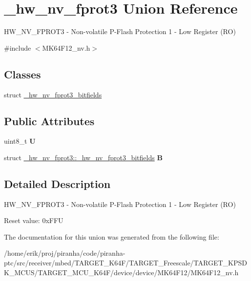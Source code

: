 \hypertarget{union__hw__nv__fprot3}{}\section{\+\_\+hw\+\_\+nv\+\_\+fprot3 Union Reference}
\label{union__hw__nv__fprot3}


H\+W\+\_\+\+N\+V\+\_\+\+F\+P\+R\+O\+T3 -\/ Non-\/volatile P-\/\+Flash Protection 1 -\/ Low Register (RO)  




{\ttfamily \#include $<$M\+K64\+F12\+\_\+nv.\+h$>$}

\subsection*{Classes}
\begin{DoxyCompactItemize}
\item 
struct \hyperlink{struct__hw__nv__fprot3_1_1__hw__nv__fprot3__bitfields}{\+\_\+hw\+\_\+nv\+\_\+fprot3\+\_\+bitfields}
\end{DoxyCompactItemize}
\subsection*{Public Attributes}
\begin{DoxyCompactItemize}
\item 
uint8\+\_\+t {\bfseries U}\hypertarget{union__hw__nv__fprot3_abf8e2ccc95a17a7e84459ca2d775defd}{}\label{union__hw__nv__fprot3_abf8e2ccc95a17a7e84459ca2d775defd}

\item 
struct \hyperlink{struct__hw__nv__fprot3_1_1__hw__nv__fprot3__bitfields}{\+\_\+hw\+\_\+nv\+\_\+fprot3\+::\+\_\+hw\+\_\+nv\+\_\+fprot3\+\_\+bitfields} {\bfseries B}\hypertarget{union__hw__nv__fprot3_a624fa8c61eb3e1aaea947e1e986fb962}{}\label{union__hw__nv__fprot3_a624fa8c61eb3e1aaea947e1e986fb962}

\end{DoxyCompactItemize}


\subsection{Detailed Description}
H\+W\+\_\+\+N\+V\+\_\+\+F\+P\+R\+O\+T3 -\/ Non-\/volatile P-\/\+Flash Protection 1 -\/ Low Register (RO) 

Reset value\+: 0x\+F\+FU 

The documentation for this union was generated from the following file\+:\begin{DoxyCompactItemize}
\item 
/home/erik/proj/piranha/code/piranha-\/ptc/src/receiver/mbed/\+T\+A\+R\+G\+E\+T\+\_\+\+K64\+F/\+T\+A\+R\+G\+E\+T\+\_\+\+Freescale/\+T\+A\+R\+G\+E\+T\+\_\+\+K\+P\+S\+D\+K\+\_\+\+M\+C\+U\+S/\+T\+A\+R\+G\+E\+T\+\_\+\+M\+C\+U\+\_\+\+K64\+F/device/device/\+M\+K64\+F12/M\+K64\+F12\+\_\+nv.\+h\end{DoxyCompactItemize}

